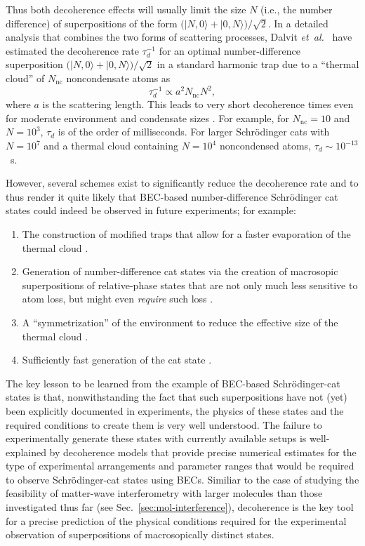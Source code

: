 \documentclass[12pt,aps,floatfix,amsmath,amssymb,showpacs,nofootinbib]{revtex4-2}
\newcommand{\be}{\begin{equation}} \newcommand{\ee}{\end{equation}}
\newcommand{\bn}{\begin{enumerate}} \newcommand{\en}{\end{enumerate}}
\newcommand{\etal}{\emph{et~al.\ }}
\newcommand{\ket}[1]{\ensuremath{|{#1\rangle}}}
\begin{document}
Thus both decoherence effects will usually limit the size $N$ (i.e.,
the number difference) of superpositions of the form $\bigl( \ket{N,0}
+ \ket{0,N} \bigr) / \sqrt{2}$. In a detailed analysis that combines
the two forms of scattering processes, Dalvit \etal \cite{Dalvit:2000:bb}
have estimated the decoherence rate $\tau_d^{-1}$ for an optimal
number-difference superposition $\bigl( \ket{N,0} + \ket{0,N} \bigr) /
\sqrt{2}$ in a standard harmonic trap due to a ``thermal cloud'' of
$N_\text{nc}$ noncondensate atoms as
%
\be
\tau_d^{-1} \propto  a^2 N_\text{nc} N^2,
\ee
%
where $a$ is the scattering length. This leads to very short
decoherence times even for moderate environment and condensate sizes
\cite{Dalvit:2000:bb,Louis:2001:mu}. For example, for $N_\text{nc}=10$
and $N=10^3$, $\tau_d$ is of the order of milliseconds. For larger
Schr\"odinger cats with $N=10^7$ and a thermal cloud containing
$N=10^4$ noncondensed atoms, $\tau_d \sim 10^{-13}$~s.  

However, several schemes exist to significantly reduce the decoherence
rate and to thus render it quite likely that BEC-based
number-difference Schr\"odinger cat states could indeed be observed in
future experiments; for example:

\bn

\item The construction of modified traps that allow for a faster
  evaporation of the thermal cloud \cite{Dalvit:2000:bb}.
  
\item Generation of number-difference cat states via the creation of
  macrosopic superpositions of relative-phase states that are not only
  much less sensitive to atom loss, but might even {\it require} such
  loss \cite{Dunningham:2001:da}.
  
\item A ``symmetrization'' of the environment to reduce the effective
  size of the thermal cloud \cite{Dalvit:2000:bb}.
  
\item Sufficiently fast generation of the cat state
  \cite{Micheli:2003:jn}.

\en

The key lesson to be learned from the example of BEC-based
Schr\"odinger-cat states is that, nonwithstanding the fact that such
superpositions have not (yet) been explicitly documented in
experiments, the physics of these states and the required conditions
to create them is very well understood. The failure to experimentally
generate these states with currently available setups is
well-explained by decoherence models that provide precise numerical
estimates for the type of experimental arrangements and parameter
ranges that would be required to observe Schr\"odinger-cat states
using BECs.  Similiar to the case of studying the feasibility of
matter-wave interferometry with larger molecules than those
investigated thus far (see Sec.~\ref{sec:mol-interference}),
decoherence is the key tool for a precise prediction of the physical
conditions required for the experimental observation of superpositions
of macrosopically distinct states. 
\end{document}
